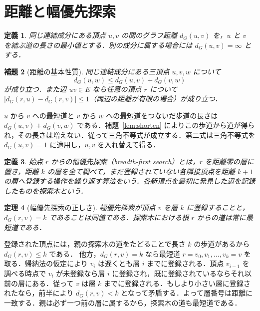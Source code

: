 \documentclass[a5paper,10pt,onecolumn]{jsarticle}
\makeatletter
\theoremstyle{mathnotetheorem}
\newtheorem{theorem}{定理}[section]
\newtheorem{definition}[theorem]{定義}
\newtheorem{lemma}[theorem]{補題}
\renewcommand{\proofname}{証明}
\renewenvironment{proof}[1][\proofname]{%
  \par\pushQED{\qed}\normalfont\topsep4\p@\@plus2\p@\relax
  \trivlist\item[\hskip\labelsep\bfseries #1]\ignorespaces
}{\popQED\endtrivlist\@endpefalse}
\makeatother
\begin{document}
\section{距離と幅優先探索}
\begin{definition}
同じ連結成分にある頂点 $u,v$ の間の\emph{グラフ距離} $d_G(u,v)$ を，$u$ と $v$ を結ぶ道の長さの最小値とする．別の成分に属する場合には $d_G(u,v)=\infty$ とする．
\end{definition}
\begin{lemma}[距離の基本性質]
同じ連結成分にある三頂点 $u,v,w$ について
\[
 d_G(u,w)\le d_G(u,v)+d_G(v,w)
\]
が成り立つ．また辺 $uv\in E$ なら任意の頂点 $r$ について
$|d_G(r,u)-d_G(r,v)|\le1$（両辺の距離が有限の場合）が成り立つ．
\end{lemma}
\begin{proof}
$u$ から $v$ への最短道と $v$ から $w$ への最短道をつないだ歩道の長さは $d_G(u,v)+d_G(v,w)$ である．補題~\ref{lem:shorten} によりこの歩道から道が得られ，その長さは増えない．従って三角不等式が成立する．第二式は三角不等式を $d_G(u,v)=1$ に適用し，$u,v$ を入れ替えて得る．
\end{proof}
\begin{definition}
始点 $r$ からの\emph{幅優先探索}（breadth-first search）とは，$r$ を距離零の層に置き，距離 $k$ の層を全て調べて，まだ登録されていない各隣接頂点を距離 $k+1$ の層へ登録する操作を繰り返す算法をいう．各新頂点を最初に発見した辺を記録したものを探索木という．
\end{definition}
\begin{theorem}[幅優先探索の正しさ]\label{thm:bfs}
幅優先探索が頂点 $v$ を層 $k$ に登録することと，$d_G(r,v)=k$ であることは同値である．探索木における根 $r$ からの道は常に最短道である．
\end{theorem}
\begin{proof}
登録された頂点には，親の探索木の道をたどることで長さ $k$ の歩道があるから $d_G(r,v)\le k$ である．
他方，$d_G(r,v)=k$ なら最短道 $r=v_0,v_1,\dots,v_k=v$ を取る．帰納法の仮定により $v_i$ は遅くとも層 $i$ までに登録される．頂点 $v_{i-1}$ を調べる時点で $v_i$ が未登録なら層 $i$ に登録され，既に登録されているならそれ以前の層にある．従って $v$ は層 $k$ までに登録される．もしより小さい層に登録されたなら，前半により $d_G(r,v)<k$ となって矛盾する．よって層番号は距離に一致する．親は必ず一つ前の層に属するから，探索木の道も最短道である．
\end{proof}
\end{document}
